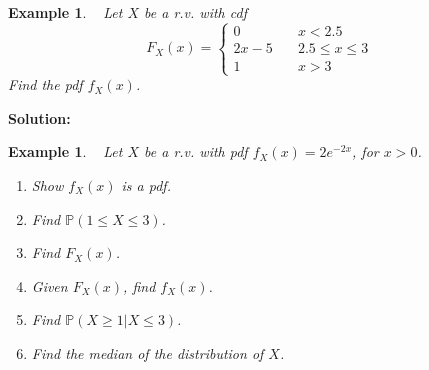 \documentclass[12pt]{amsart}
\newtheorem{example}[theorem]{Example}
\newcommand\Pbb{\mathbb{P}}
\newcommand\pdfX{f_X(x)}
\newcommand\cdfX{F_X(x)}
\begin{document}
{%
\newpage


\begin{example}\ %
Let $X$ be a r.v. with cdf
$$
\cdfX = \left\{
        \begin{array}{ll}
            0 & \quad x < 2.5 \\
            2x-5 & \quad 2.5 \leq x \leq 3 \\
            1 & \quad x > 3
        \end{array}
    \right.
$$
Find the pdf $\pdfX$.
\end{example}
\textbf{Solution:}
\vspace{6cm}




\begin{example}\ %
Let $X$ be a r.v. with pdf $\pdfX = 2e^{-2x}$, for $x>0$.

\begin{enumerate}
\item Show $\pdfX$ is a pdf.
\vspace{6cm}

\item Find $\Pbb(1 \leq X \leq 3)$.
\vspace{4cm}

\newpage
\item Find $\cdfX$.
\vspace{5cm}

\item Given $\cdfX$, find $\pdfX$.
\vspace{5cm}

\item Find $\Pbb(X \geq 1 | X \leq 3)$.
\vspace{6cm}

\item Find the median of the distribution of $X$.
\end{enumerate}




\end{example}




}  %
\end{document}
